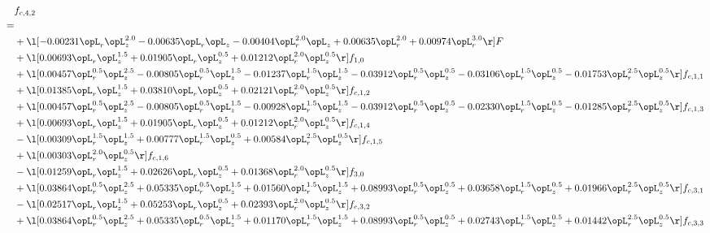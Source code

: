 \begin{alignat}{2} 
\label{eq:f_42_1} 
& f_{c,4,2} \nonumber \\ 
 = \\ 
& + \l[  -0.00231 \opL_r \opL_z^{2.0}   -0.00635 \opL_r \opL_z   -0.00404 \opL_r^{2.0} \opL_z +  0.00635 \opL_r^{2.0} +  0.00974 \opL_r^{3.0}  \r] F \nonumber \\ 
& + \l[  0.00693 \opL_r \opL_z^{1.5} +  0.01905 \opL_r \opL_z^{0.5} +  0.01212 \opL_r^{2.0} \opL_z^{0.5}  \r] f_{1,0} \nonumber \\ 
& + \l[  0.00457 \opL_r^{0.5} \opL_z^{2.5}   -0.00805 \opL_r^{0.5} \opL_z^{1.5}   -0.01237 \opL_r^{1.5} \opL_z^{1.5}   -0.03912 \opL_r^{0.5} \opL_z^{0.5}   -0.03106 \opL_r^{1.5} \opL_z^{0.5}   -0.01753 \opL_r^{2.5} \opL_z^{0.5}  \r] f_{c,1,1} \nonumber \\ 
& + \l[  0.01385 \opL_r \opL_z^{1.5} +  0.03810 \opL_r \opL_z^{0.5} +  0.02121 \opL_r^{2.0} \opL_z^{0.5}  \r] f_{c,1,2} \nonumber \\ 
& + \l[  0.00457 \opL_r^{0.5} \opL_z^{2.5}   -0.00805 \opL_r^{0.5} \opL_z^{1.5}   -0.00928 \opL_r^{1.5} \opL_z^{1.5}   -0.03912 \opL_r^{0.5} \opL_z^{0.5}   -0.02330 \opL_r^{1.5} \opL_z^{0.5}   -0.01285 \opL_r^{2.5} \opL_z^{0.5}  \r] f_{c,1,3} \nonumber \\ 
& + \l[  0.00693 \opL_r \opL_z^{1.5} +  0.01905 \opL_r \opL_z^{0.5} +  0.01212 \opL_r^{2.0} \opL_z^{0.5}  \r] f_{c,1,4} \nonumber \\ 
& - \l[  0.00309 \opL_r^{1.5} \opL_z^{1.5} +  0.00777 \opL_r^{1.5} \opL_z^{0.5} +  0.00584 \opL_r^{2.5} \opL_z^{0.5}  \r] f_{c,1,5} \nonumber \\ 
& + \l[  0.00303 \opL_r^{2.0} \opL_z^{0.5}  \r] f_{c,1,6} \nonumber \\ 
& - \l[  0.01259 \opL_r \opL_z^{1.5} +  0.02626 \opL_r \opL_z^{0.5} +  0.01368 \opL_r^{2.0} \opL_z^{0.5}  \r] f_{3,0} \nonumber \\ 
& + \l[  0.03864 \opL_r^{0.5} \opL_z^{2.5} +  0.05335 \opL_r^{0.5} \opL_z^{1.5} +  0.01560 \opL_r^{1.5} \opL_z^{1.5} +  0.08993 \opL_r^{0.5} \opL_z^{0.5} +  0.03658 \opL_r^{1.5} \opL_z^{0.5} +  0.01966 \opL_r^{2.5} \opL_z^{0.5}  \r] f_{c,3,1} \nonumber \\ 
& - \l[  0.02517 \opL_r \opL_z^{1.5} +  0.05253 \opL_r \opL_z^{0.5} +  0.02393 \opL_r^{2.0} \opL_z^{0.5}  \r] f_{c,3,2} \nonumber \\ 
& + \l[  0.03864 \opL_r^{0.5} \opL_z^{2.5} +  0.05335 \opL_r^{0.5} \opL_z^{1.5} +  0.01170 \opL_r^{1.5} \opL_z^{1.5} +  0.08993 \opL_r^{0.5} \opL_z^{0.5} +  0.02743 \opL_r^{1.5} \opL_z^{0.5} +  0.01442 \opL_r^{2.5} \opL_z^{0.5}  \r] f_{c,3,3} \nonumber \\ 

\end{alignat}
